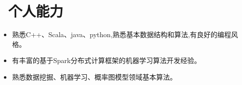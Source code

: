 \documentclass{resume}
\begin{document}

\section{\faCogs\ 个人能力}
\begin{itemize}[parsep=0.5ex]
  \item 熟悉C++、Scala、java、python,熟悉基本数据结构和算法,有良好的编程风格。
  \item 有丰富的基于Spark分布式计算框架的机器学习算法开发经验。
  \item 熟悉数据挖掘、机器学习、概率图模型领域基本算法。
\end{itemize}


%
%
\end{document}
